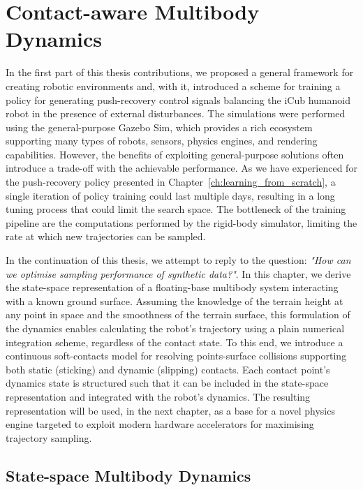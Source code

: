 \acresetall
\chapter{Contact-aware Multibody Dynamics}
\label{ch:contact_aware_dynamics}

In the first part of this thesis contributions, we proposed a general framework for creating robotic environments and, with it, introduced a scheme for training a policy for generating push-recovery control signals balancing the iCub humanoid robot in the presence of external disturbances.
The simulations were performed using the general-purpose Gazebo Sim, which provides a rich ecosystem supporting many types of robots, sensors, physics engines, and rendering capabilities.
However, the benefits of exploiting general-purpose solutions often introduce a trade-off with the achievable performance.
As we have experienced for the push-recovery policy presented in Chapter~\ref{ch:learning_from_scratch}, a single iteration of policy training could last multiple days, resulting in a long tuning process that could limit the search space.
The bottleneck of the training pipeline are the computations performed by the rigid-body simulator, limiting the rate at which new trajectories can be sampled.

In the continuation of this thesis, we attempt to reply to the question: \textit{"How can we optimise sampling performance of synthetic data?"}.
In this chapter, we derive the state-space representation of a floating-base multibody system interacting with a known ground surface.
Assuming the knowledge of the terrain height at any point in space and the smoothness of the terrain surface, this formulation of the dynamics enables calculating the robot's trajectory using a plain numerical integration scheme, regardless of the contact state.
To this end, we introduce a continuous soft-contacts model for resolving points-surface collisions supporting both static (sticking) and dynamic (slipping) contacts.
Each contact point's dynamics state is structured such that it can be included in the state-space representation and integrated with the robot's dynamics.
The resulting representation will be used, in the next chapter, as a base for a novel physics engine targeted to exploit modern hardware accelerators for maximising trajectory sampling.

\section{State-space Multibody Dynamics}

